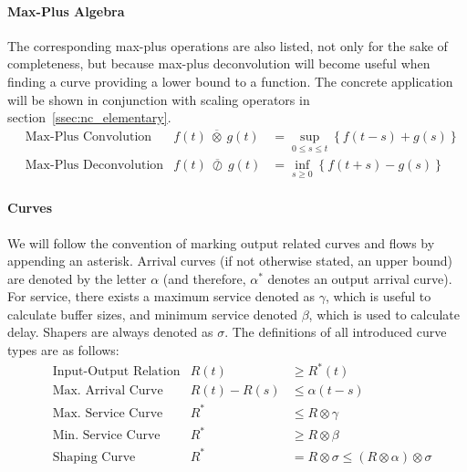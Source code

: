 \paragraph{Max-Plus Algebra}
The corresponding max-plus operations are also listed, not only for the sake of completeness, but because max-plus deconvolution
will become useful when finding a curve providing a lower bound to a function. The concrete application will be shown in conjunction with scaling operators in section~\ref{ssec:nc_elementary}.
%
\begin{equation}
\begin{aligned}
&\text{Max-Plus Convolution} &f(t)\phantom{~} \overline{\otimes}\phantom{~} g(t) &= \sup_{0 \le s \le t} \left\{f(t-s) + g(s) \right\} \\[8pt]
&\text{Max-Plus Deconvolution}&f(t)\phantom{~}  \overline{\oslash}\phantom{~} g(t) &= \inf_{s \ge 0} \left\{f(t+s) - g(s) \right\}
\end{aligned}
\end{equation}
%
\paragraph{Curves}
We will follow the convention of marking output related curves and flows by appending an asterisk. Arrival curves (if not otherwise stated, an upper bound) are
denoted by the letter $\alpha$ (and therefore, $\alpha^*$ denotes an output arrival curve). For service, there exists a maximum service denoted as $\gamma$,
which is useful to calculate buffer sizes, and minimum service denoted $\beta$, which is used to calculate delay. Shapers are always denoted as $\sigma$.
The definitions of all introduced curve types are as follows:
%
\begin{equation}
\begin{aligned}
&\text{Input-Output Relation} &R(t) &\ge R^*(t)\\[8pt]
&\text{Max. Arrival Curve} &R(t) - R(s) &\le \alpha(t - s)\\[8pt]
&\text{Max. Service Curve} &R^* &\le R \otimes \gamma\\[8pt]
&\text{Min. Service Curve} &R^* &\ge R \otimes \beta\\[8pt]
&\text{Shaping Curve} &R^* &= R \otimes \sigma \le (R \otimes \alpha) \otimes \sigma
\end{aligned}
\end{equation}
%
